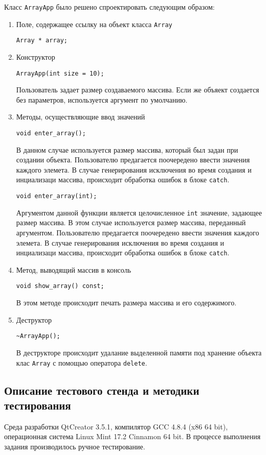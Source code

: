 \documentclass[12pt,a4paper]{report}
\begin{document}
Класс \verb+ArrayApp+ было решено спроектировать следующим образом: 
\begin{enumerate}
 	\item Поле, содержащее ссылку на объект класса \verb+Array+
 	
 	\verb+Array * array;+
 	
	\item Конструктор
	
	\verb+ArrayApp(int size = 10);+

	Пользователь задает размер создаваемого массива. Если же объяект создается без параметров, используется аргумент по умолчанию.

	\item Методы, осуществляющие ввод значений
	
	\verb+void enter_array();+
	
	В данном случае используется размер массива, который был задан при создании объекта. Пользователю предагается поочередено ввести значения каждого элемета. В случае генерирования исключения во время создания и инциализаци массива, происходит обработка ошибок в блоке \verb+catch+.
	
	\verb+void enter_array(int);+
	
	Аргументом данной функции является целочисленное \verb+int+ значение, задающее размер массива. В этом случае используется размер массива, переданный аргументом. Пользователю предагается поочередено ввести значения каждого элемета. В случае генерирования исключения во время создания и инциализаци массива, происходит обработка ошибок в блоке \verb+catch+.
	
	\item Метод, выводящий массив в консоль
	
	\verb+void show_array() const;+
	
	В этом методе происходит печать размера массива и его содержимого.
	
	\item Деструктор	
	
	\verb+~ArrayApp();+
	
	В деструкторе происходит удалание выделенной памяти под хранение объекта клас \verb+Array+ с помощью оператора \verb+delete+.
	
\end{enumerate}

\subsection{Описание тестового стенда и методики тестирования}
\hspace{\parindent}Среда разработки QtCreator 3.5.1, компилятор GCC 4.8.4 (x86 64 bit), операционная система Linux Mint 17.2 Cinnamon 64 bit.
В процессе выполнения задания производилось ручное тестирование.
\end{document}
